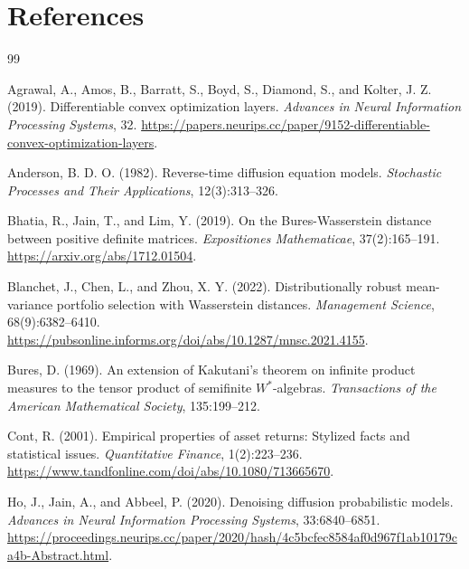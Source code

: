 \documentclass{article}
\begin{document}
\clearpage
\section*{References}

\begin{thebibliography}{99}

Agrawal, A., Amos, B., Barratt, S., Boyd, S., Diamond, S., and Kolter, J. Z.
(2019).
\newblock Differentiable convex optimization layers.
\newblock \emph{Advances in Neural Information Processing Systems}, 32.
\newblock \url{https://papers.neurips.cc/paper/9152-differentiable-convex-optimization-layers}.

Anderson, B. D. O. (1982).
\newblock Reverse-time diffusion equation models.
\newblock \emph{Stochastic Processes and Their Applications}, 12(3):313--326.

Bhatia, R., Jain, T., and Lim, Y. (2019).
\newblock On the Bures-Wasserstein distance between positive definite matrices.
\newblock \emph{Expositiones Mathematicae}, 37(2):165--191.
\newblock \url{https://arxiv.org/abs/1712.01504}.

Blanchet, J., Chen, L., and Zhou, X. Y. (2022).
\newblock Distributionally robust mean-variance portfolio selection with
Wasserstein distances.
\newblock \emph{Management Science}, 68(9):6382--6410.
\newblock \url{https://pubsonline.informs.org/doi/abs/10.1287/mnsc.2021.4155}.

Bures, D. (1969).
\newblock An extension of Kakutani's theorem on infinite product measures to the
tensor product of semifinite $W^*$-algebras.
\newblock \emph{Transactions of the American Mathematical Society}, 135:199--212.

Cont, R. (2001).
\newblock Empirical properties of asset returns: Stylized facts and statistical
issues.
\newblock \emph{Quantitative Finance}, 1(2):223--236.
\newblock \url{https://www.tandfonline.com/doi/abs/10.1080/713665670}.

Ho, J., Jain, A., and Abbeel, P. (2020).
\newblock Denoising diffusion probabilistic models.
\newblock \emph{Advances in Neural Information Processing Systems}, 33:6840--6851.
\newblock \url{https://proceedings.neurips.cc/paper/2020/hash/4c5bcfec8584af0d967f1ab10179ca4b-Abstract.html}.


\end{thebibliography}
\end{document}
